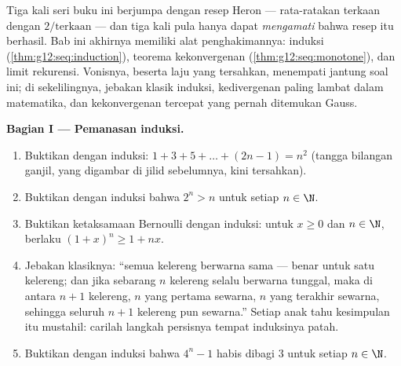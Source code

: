 \begin{problem}
\label{pb:g12:seq:1}
Tiga kali seri buku ini berjumpa dengan resep Heron --- rata-ratakan
terkaan dengan $2/\text{terkaan}$ --- dan tiga kali pula hanya dapat
\emph{mengamati} bahwa resep itu berhasil. Bab ini akhirnya memiliki
alat penghakimannya: induksi
(\cref{thm:g12:seq:induction}), teorema kekonvergenan 
(\cref{thm:g12:seq:monotone}), dan limit rekurensi. Vonisnya,
beserta laju yang tersahkan, menempati jantung soal
ini; di sekelilingnya, jebakan klasik induksi, kedivergenan paling lambat
dalam matematika, dan kekonvergenan tercepat yang pernah ditemukan
Gauss.

\medskip
\noindent\textbf{Bagian I --- Pemanasan induksi.}
\begin{enumerate}
  \item Buktikan dengan induksi:
        $1 + 3 + 5 + \dots + (2n - 1) = n^2$ (tangga
        bilangan ganjil, yang digambar di jilid sebelumnya, kini
        tersahkan).
  \item Buktikan dengan induksi bahwa $2^n > n$ untuk setiap
        $n \in \N$.
  \item Buktikan ketaksamaan Bernoulli dengan induksi: untuk
        $x \geq 0$ dan $n \in \N$, berlaku
        $(1 + x)^n \geq 1 + nx$.
  \item Jebakan klasiknya: ``semua kelereng berwarna sama ---
        benar untuk satu kelereng; dan jika sebarang $n$ kelereng selalu
        berwarna tunggal, maka di antara $n + 1$ kelereng, $n$ yang
        pertama sewarna, $n$ yang terakhir sewarna, sehingga seluruh
        $n + 1$ kelereng pun sewarna.'' Setiap anak tahu kesimpulan itu
        mustahil: carilah langkah persisnya tempat induksinya patah.
  \item Buktikan dengan induksi bahwa $4^n - 1$ habis dibagi $3$
        untuk setiap $n \in \N$.
\end{enumerate}


\end{problem}
